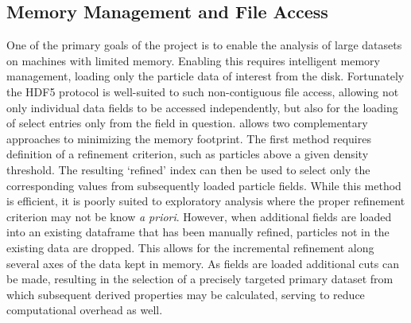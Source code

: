 \subsection{Memory Management and File Access}
\label{sec:fileIO}
One of the primary goals of the  project is to enable the analysis of large datasets on machines with limited memory.
Enabling this requires intelligent memory management, loading only the particle data of interest from the disk.
Fortunately the HDF5 protocol is well-suited to such non-contiguous file access, allowing not only individual data fields to be accessed independently, but also for the loading of select entries only from the field in question.
 allows two complementary approaches to minimizing the memory footprint.
The first method requires definition of a refinement criterion, such as particles above a given density threshold.
The resulting `refined' index can then be used to select only the corresponding values from subsequently loaded particle fields.
While this method is efficient, it is poorly suited to exploratory analysis where the proper refinement criterion may not be know {\it{a priori}}.
However, when additional fields are loaded into an existing  dataframe that has been manually refined, particles not in the existing data are dropped.
This allows for the incremental refinement along several axes of the data kept in memory.
As fields are loaded additional cuts can be made, resulting in the selection of a precisely targeted primary dataset from which subsequent derived properties may be calculated, serving to reduce computational overhead as well.